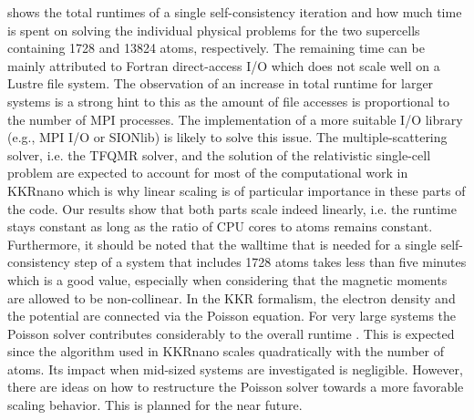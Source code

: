 \documentclass[graybox]{svmult}
\begin{document}
shows the total runtimes of a single self-consistency iteration and how much time is spent
on solving the individual physical problems for the two supercells containing 1728 and 13824 atoms, respectively.
The remaining time
can be mainly attributed to Fortran direct-access I/O which does not scale well on a Lustre file system.
The observation of an increase in total runtime for larger systems is a strong hint to this as the amount of
file accesses is proportional to the number of MPI processes.
The implementation of a more suitable I/O library (e.g., MPI I/O or SIONlib) is likely to solve this issue.
The multiple-scattering solver, i.e. the TFQMR solver, 
and the solution of the relativistic single-cell problem are
expected to account for most of the computational work in KKRnano which 
is why linear scaling is of particular importance in these parts of the code.
Our results show that both parts scale indeed linearly, i.e. the runtime stays constant as long as
the ratio of CPU cores to atoms remains constant.
Furthermore, it should be noted that the walltime that is needed for a single self-consistency step of a system
that includes 1728 atoms
takes less than five minutes which is a good value, especially when considering that
the magnetic moments are allowed to be non-collinear.
In the KKR formalism, the electron density and the potential are connected via the Poisson equation. 
For very large systems the Poisson solver contributes considerably
to the overall runtime \cite{brommel_juqueen_2017}.
This is expected since the algorithm used in KKRnano scales
quadratically with the number of atoms. Its impact when mid-sized systems are investigated is negligible. 
However, there are ideas on how to restructure the Poisson solver towards a more favorable scaling behavior.
This is planned for the near future.
\end{document}
